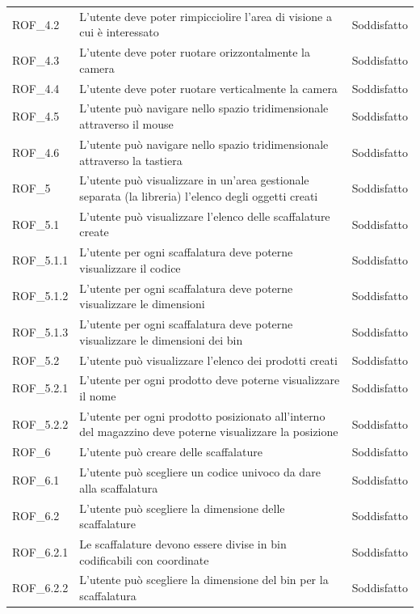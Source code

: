\begin{xltabular}{\textwidth}{ p{0.1\textwidth} | X | p{0.3\textwidth} }
    ROF\_4.2 & L'utente deve poter rimpicciolire l'area di visione a cui è interessato & Soddisfatto \\
    ROF\_4.3 & L'utente deve poter ruotare orizzontalmente la camera & Soddisfatto \\
    ROF\_4.4 & L'utente deve poter ruotare verticalmente la camera & Soddisfatto \\
    ROF\_4.5 & L'utente può navigare nello spazio tridimensionale attraverso il mouse& Soddisfatto\\
    ROF\_4.6 & L'utente può navigare nello spazio tridimensionale attraverso la tastiera& Soddisfatto\\
    ROF\_5 & L'utente può visualizzare in un'area gestionale separata (la libreria) l'elenco degli oggetti creati & Soddisfatto \\
    ROF\_5.1 & L'utente può visualizzare l'elenco delle scaffalature create & Soddisfatto\\
    ROF\_5.1.1 & L'utente per ogni scaffalatura deve poterne visualizzare il codice & Soddisfatto\\
    ROF\_5.1.2 & L'utente per ogni scaffalatura deve poterne visualizzare le dimensioni & Soddisfatto\\
    ROF\_5.1.3 & L'utente per ogni scaffalatura deve poterne visualizzare le dimensioni dei bin & Soddisfatto\\
    ROF\_5.2 & L'utente può visualizzare l'elenco dei prodotti creati & Soddisfatto \\
    ROF\_5.2.1 & L'utente per ogni prodotto deve poterne visualizzare il nome & Soddisfatto\\
    ROF\_5.2.2 & L'utente per ogni prodotto posizionato all'interno del magazzino deve poterne visualizzare la posizione & Soddisfatto \\
    ROF\_6 & L'utente può creare delle scaffalature & Soddisfatto\\
    ROF\_6.1 & L'utente può scegliere un codice univoco da dare alla scaffalatura & Soddisfatto\\
    ROF\_6.2 & L'utente può scegliere la dimensione delle scaffalature & Soddisfatto\\
    ROF\_6.2.1 & Le scaffalature devono essere divise in bin codificabili con coordinate & Soddisfatto\\
    ROF\_6.2.2 & L'utente può scegliere la dimensione del bin per la scaffalatura & Soddisfatto\\

\end{xltabular}
